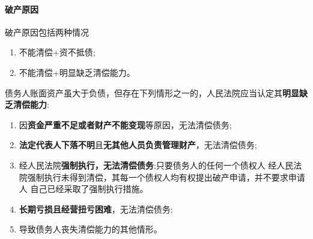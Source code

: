 \documentclass[UTF8,12pt]{ctexart}
\numberwithin{equation}{section} %
\numberwithin{figure}{section}
\numberwithin{table}{section}
\begin{document}
	\paragraph{破产原因}
	破产原因包括两种情况
	\begin{enumerate}
		\item 不能清偿+资不抵债;
		
		\item 不能清偿+明显缺乏清偿能力。
	\end{enumerate}

	债务人账面资产虽大于负债，但存在下列情形之一的，人民法院应当认定其\textbf{明显缺乏清偿能力}: 
	\begin{enumerate}
		\item 因\textbf{资金严重不足或者财产不能变现}等原因，无法清偿债务; 
		
		\item \textbf{法定代表人下落不明}且\textbf{无其他人员负责管理财产}，无法清偿债务;
		
		\item 经人民法院\textbf{强制执行，无法清偿债务};只要债务人的任何一个债权人 经人民法院强制执行未得到清偿，其每一个债权人均有权提出破产申请，并不要求申请人 自己已经采取了强制执行措施。
		
		\item \textbf{长期亏损且经营扭亏困难}，无法清偿债务;
		
		\item 导致债务人丧失清偿能力的其他情形。
	\end{enumerate}
\end{document}

